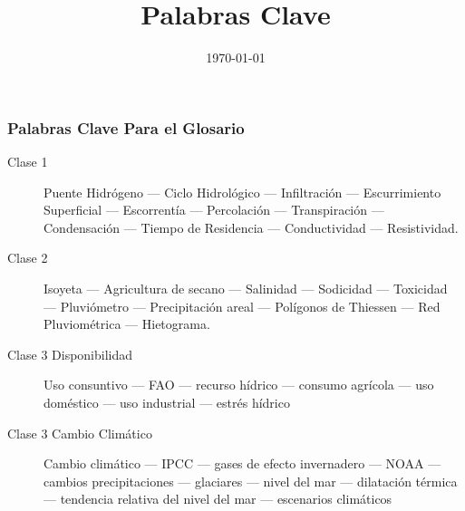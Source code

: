 \documentclass[14pt,a4paper]{extarticle}
\date{\today}
\title{Palabras Clave}
\begin{document}
\subsubsection{Palabras Clave Para el Glosario}

\begin{description}
\item[{Clase 1}] Puente Hidrógeno --- Ciclo Hidrológico --- Infiltración 
--- Escurrimiento Superficial --- Escorrentía --- Percolación --- 
Transpiración --- Condensación --- Tiempo de Residencia --- 
Conductividad --- Resistividad.

\item[{Clase 2}] Isoyeta --- Agricultura de secano --- Salinidad --- 
Sodicidad --- Toxicidad --- Pluviómetro --- Precipitación 
areal --- Polígonos de Thiessen --- Red Pluviométrica --- Hietograma.

\item[{Clase 3 Disponibilidad}] Uso consuntivo --- FAO --- recurso hídrico
--- consumo agrícola --- uso doméstico --- uso industrial --- 
estrés hídrico

\item[{Clase 3 Cambio Climático}] Cambio climático --- IPCC --- 
gases de efecto invernadero --- NOAA --- cambios precipitaciones 
--- glaciares --- nivel del mar --- dilatación térmica --- tendencia
relativa del nivel del mar --- escenarios climáticos
\end{description}
\end{document}
